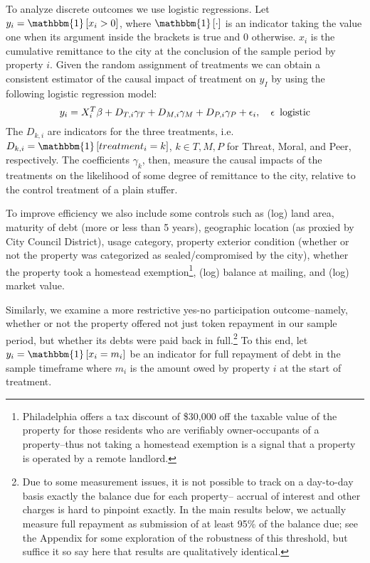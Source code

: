 \documentclass[12pt,titlepage]{article}
\begin{document}
To analyze discrete outcomes we use logistic regressions.
Let $y_{i}=\mathbbm{1}\left[x_i>0\right]$, where
$\mathbbm{1}\left[\cdot\right]$ is an indicator taking the value one
when its argument inside the brackets is true and 0 otherwise. $x_i$ is the
cumulative remittance to the city at the conclusion of the sample
period by property $i$. Given the random assignment of treatments
we can obtain a consistent estimator of the causal impact of treatment on
$y_I$ by using the following logistic regression model:
\begin{equation}
y_{i}=X_i^T\beta +D_{T,i}\gamma_{T}+D_{M,i}\gamma_{M}+D_{P,i}\gamma_{P}
+\epsilon_{i},\hspace{1em}\epsilon \enskip\mbox{logistic}
\end{equation}
The $D_{k,i}$ are indicators for the three treatments, i.e.
$D_{k,i}=\mathbbm{1}\left[treatment_i=k\right]$, $k\in{T,M,P}$ for
Threat, Moral, and Peer, respectively. The coefficients $\gamma_{k}$, then, measure
the causal impacts of the treatments on the likelihood of some degree
of remittance to the city, relative to the control treatment of a
plain stuffer. 

To improve efficiency we also include some controls such as (log) land area, maturity of debt (more
or less than 5 years), geographic location (as proxied by City Council
District), usage category, property exterior condition (whether or not
the property was categorized as sealed/compromised by the city),
whether the property took a homestead exemption\footnote{Philadelphia
  offers a tax discount of \$30,000 off the taxable value of the
  property for those residents who are verifiably owner-occupants of a
  property--thus not taking a homestead exemption is a signal that a
  property is operated by a remote landlord.}, (log) balance at
mailing, and (log) market value.

Similarly, we examine a more restrictive yes-no participation
outcome--namely, whether or not the property offered not just token
repayment in our sample period, but whether its debts were paid back
in full.\footnote{Due to some measurement issues, it is not possible to
  track on a day-to-day basis exactly the balance due for each
  property-- accrual of interest and other charges is hard to pinpoint
  exactly. In the main results below, we actually measure full
  repayment as submission of at least 95\% of the balance due; see the
  Appendix for some exploration of the robustness of this threshold,
  but suffice it so say here that results are qualitatively
  identical.} To this end, let $y_{i}=\mathbbm{1}\left[x_i=m_i\right]$ be an
indicator for full repayment of debt in the sample timeframe where $m_i$ is
the amount owed by property $i$ at the start of treatment. 
\end{document}
